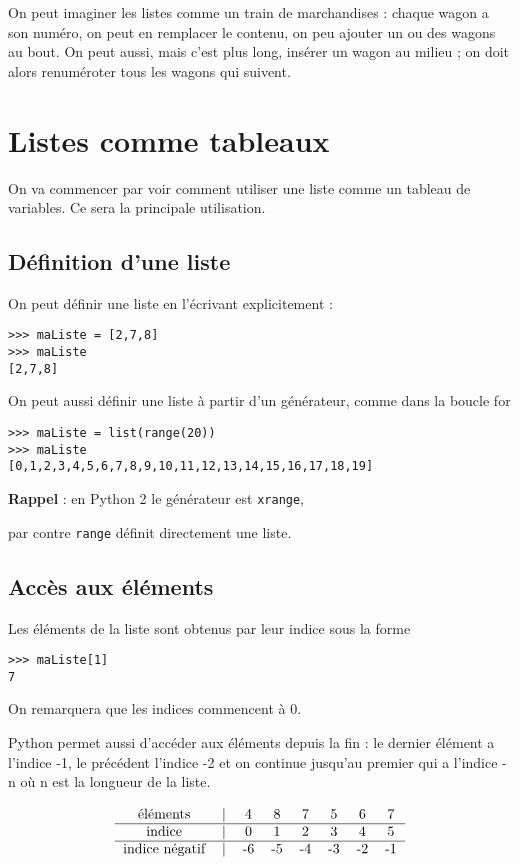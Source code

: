 On peut imaginer les listes comme un train de marchandises : chaque wagon a son numéro, on peut en remplacer le contenu, on peu ajouter un ou des wagons au bout. On peut aussi, mais c’est plus long, insérer un wagon au milieu ; on doit alors renuméroter tous les wagons qui suivent.

\section{Listes comme tableaux}

On va commencer par voir comment utiliser une liste comme un tableau de variables.
Ce sera la principale utilisation.

\subsection{Définition d'une liste}

On peut définir une liste en l’écrivant explicitement :
\begin{lstlisting}
>>> maListe = [2,7,8]
>>> maListe
[2,7,8]
\end{lstlisting}


On peut aussi définir une liste à partir d’un générateur, comme dans la boucle for
\begin{lstlisting}
>>> maListe = list(range(20)) 
>>> maListe
[0,1,2,3,4,5,6,7,8,9,10,11,12,13,14,15,16,17,18,19]
\end{lstlisting}

\textbf{Rappel} : en Python 2 le générateur est \lstinline?xrange?, 

par contre \lstinline?range? définit directement une liste.

\subsection{Accès aux éléments}

Les éléments de la liste sont obtenus par leur indice sous la forme
\begin{lstlisting}
>>> maListe[1]
7
\end{lstlisting}

On remarquera que les indices commencent à 0.

Python permet aussi d’accéder aux éléments depuis la fin : le dernier élément a l’indice -1, le précédent l’indice -2 et on continue jusqu’au premier qui a l’indice -n où n est la longueur de la liste.


\[
\begin{tabular}{cccccccc}
éléments & $\vert$ & 4&8&7&5&6&7\\
  \hline
indice & $\vert$ & 0&1&2&3&4&5\\
  \hline
indice négatif& $\vert$ & -6&-5&-4&-3&-2&-1\\
\end{tabular}
\]


